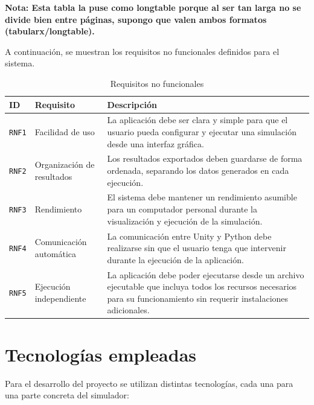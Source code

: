 \par\medskip
\textbf{Nota: Esta tabla la puse como longtable porque al ser tan larga no se divide bien entre páginas, supongo que valen ambos formatos (tabularx/longtable).}
\par\medskip

A continuación, se muestran los requisitos no funcionales definidos para el sistema.

\begin{table}[H]
    \centering
    \begin{tabularx}{\textwidth}{@{}llX@{}}
        \toprule
        \textbf{ID} & \textbf{Requisito} & \textbf{Descripción}\\
        \midrule
        \texttt{RNF1} & Facilidad de uso & La aplicación debe ser clara y simple para que el usuario pueda configurar y ejecutar una simulación desde una interfaz gráfica.\\
        \texttt{RNF2} & Organización de resultados & Los resultados exportados deben guardarse de forma ordenada, separando los datos generados en cada ejecución.\\
        \texttt{RNF3} & Rendimiento & El sistema debe mantener un rendimiento asumible para un computador personal durante la visualización y ejecución de la simulación.\\
        \texttt{RNF4} & Comunicación automática & La comunicación entre Unity y Python debe realizarse sin que el usuario tenga que intervenir durante la ejecución de la aplicación.\\
        \texttt{RNF5} & Ejecución independiente & La aplicación debe poder ejecutarse desde un archivo ejecutable que incluya todos los recursos necesarios para su funcionamiento sin requerir instalaciones adicionales.\\
        \bottomrule
    \end{tabularx}
    \caption{Requisitos no funcionales}
    \label{tab:requisitos_no_funcionales}
\end{table}

\section{Tecnologías empleadas}

Para el desarrollo del proyecto se utilizan distintas tecnologías, cada una para una parte concreta del simulador:

